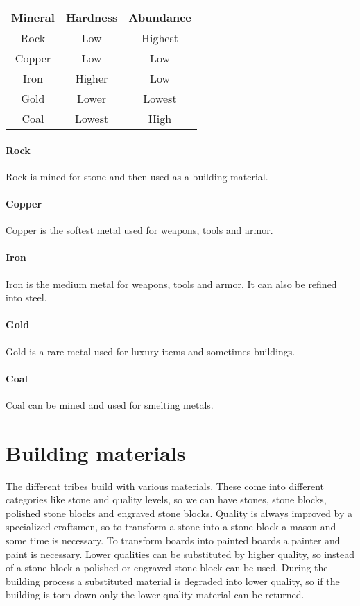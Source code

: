 \begin{longtable}{ccc}
	\toprule
	Mineral & Hardness & Abundance \\
	\midrule
	Rock    & Low      & Highest   \\
	Copper  & Low      & Low       \\
	Iron    & Higher   & Low       \\
	Gold    & Lower    & Lowest    \\
	Coal    & Lowest   & High      \\
	\bottomrule
\end{longtable}

\paragraph{Rock}

Rock is mined for stone and then used as a building material.

\paragraph{Copper}

Copper is the softest metal used for weapons, tools and armor.

\paragraph{Iron}

Iron is the medium metal for weapons, tools and armor. It can also be refined
into steel.

\paragraph{Gold}

Gold is a rare metal used for luxury items and sometimes buildings.

\paragraph{Coal}

Coal can be mined and used for smelting metals.

\section{Building materials}\label{ch:Goods:Materials}

The different \hyperref[ch:Tribes]{tribes} build with various materials. These
come into different categories like stone and quality levels, so we can have
stones, stone blocks, polished stone blocks and engraved stone blocks. Quality
is always improved by a specialized craftsmen, so to transform a stone into a
stone-block a mason and some time is necessary. To transform boards into
painted boards a painter and paint is necessary. Lower qualities can be
substituted by higher quality, so instead of a stone block a polished or
engraved stone block can be used. During the building process a substituted
material is degraded into lower quality, so if the building is torn down only
the lower quality material can be returned.

